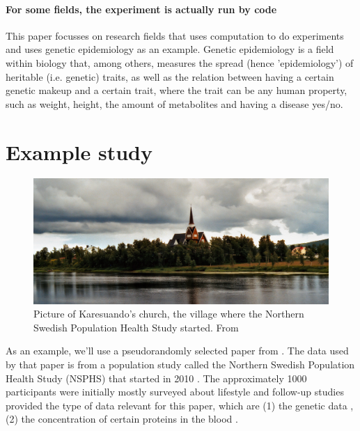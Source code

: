 \paragraph{For some fields, the experiment is actually run by code}

This paper focusses on research fields that uses computation
to do experiments and uses genetic epidemiology as an example.
Genetic epidemiology is a field within biology that, among 
others, measures the spread (hence 'epidemiology') 
of heritable (i.e. genetic) traits, as well as the relation
between having a certain genetic makeup and a certain trait,
where the trait can be any human property, such as weight, height,
the amount of metabolites and having a disease yes/no.

\section{Example study}

\begin{figure}[!htbp]
  \centering
  \includegraphics[width=\linewidth]{Karesuando_church.jpg}
  \caption{
    Picture of Karesuando's church,
    the village where the Northern Swedish Population
    Health Study started.
    From \cite{hopfner2005}
  }
  \label{fig:karesuando_church}
\end{figure}

As an example, we'll use a pseudorandomly selected paper
from \cite{ahsan2017relative}. The data used by that paper is
from a population study called the Northern Swedish Population
Health Study (NSPHS) that started in 2010 \cite{igl2010northern}. 
The approximately 1000 participants were initially mostly surveyed
about lifestyle \cite{igl2010northern} and follow-up studies
provided the type of data relevant for this paper, 
which are (1) the genetic data \cite{johansson2013identification},
(2) the concentration of certain proteins in the 
blood \cite{enroth2014strong,enroth2015effect}.

